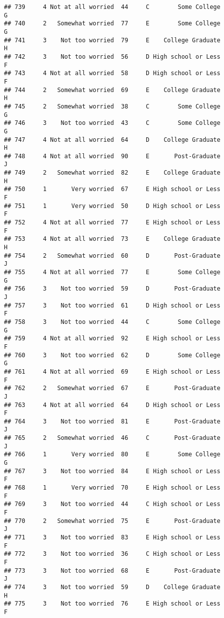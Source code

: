 \documentclass[
]{article}
\begin{document}
\begin{verbatim}
## 739     4 Not at all worried  44     C        Some College         G
## 740     2   Somewhat worried  77     E        Some College         G
## 741     3    Not too worried  79     E    College Graduate         H
## 742     3    Not too worried  56     D High school or Less         F
## 743     4 Not at all worried  58     D High school or Less         F
## 744     2   Somewhat worried  69     E    College Graduate         H
## 745     2   Somewhat worried  38     C        Some College         G
## 746     3    Not too worried  43     C        Some College         G
## 747     4 Not at all worried  64     D    College Graduate         H
## 748     4 Not at all worried  90     E       Post-Graduate         J
## 749     2   Somewhat worried  82     E    College Graduate         H
## 750     1       Very worried  67     E High school or Less         F
## 751     1       Very worried  50     D High school or Less         F
## 752     4 Not at all worried  77     E High school or Less         F
## 753     4 Not at all worried  73     E    College Graduate         H
## 754     2   Somewhat worried  60     D       Post-Graduate         J
## 755     4 Not at all worried  77     E        Some College         G
## 756     3    Not too worried  59     D       Post-Graduate         J
## 757     3    Not too worried  61     D High school or Less         F
## 758     3    Not too worried  44     C        Some College         G
## 759     4 Not at all worried  92     E High school or Less         F
## 760     3    Not too worried  62     D        Some College         G
## 761     4 Not at all worried  69     E High school or Less         F
## 762     2   Somewhat worried  67     E       Post-Graduate         J
## 763     4 Not at all worried  64     D High school or Less         F
## 764     3    Not too worried  81     E       Post-Graduate         J
## 765     2   Somewhat worried  46     C       Post-Graduate         J
## 766     1       Very worried  80     E        Some College         G
## 767     3    Not too worried  84     E High school or Less         F
## 768     1       Very worried  70     E High school or Less         F
## 769     3    Not too worried  44     C High school or Less         F
## 770     2   Somewhat worried  75     E       Post-Graduate         J
## 771     3    Not too worried  83     E High school or Less         F
## 772     3    Not too worried  36     C High school or Less         F
## 773     3    Not too worried  68     E       Post-Graduate         J
## 774     3    Not too worried  59     D    College Graduate         H
## 775     3    Not too worried  76     E High school or Less         F

\end{verbatim}
\end{document}
